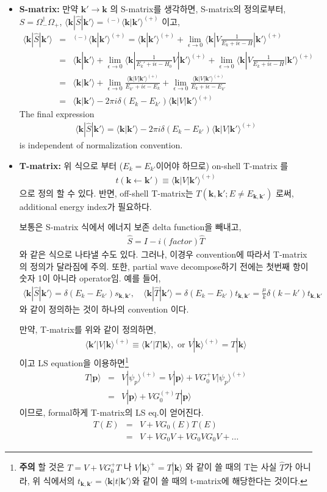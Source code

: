\documentclass[10pt]{book}
\def\bm{\boldsymbol}
\newcommand{\bea}{\begin{eqnarray}}
\newcommand{\eea}{\end{eqnarray}}
\newcommand{\no}{\nonumber \\}
\def\vp{{\bm p}}
\def\vk{{\bm k}}
\def\la{\langle}
\def\ra{\rangle}
\begin{document}
\begin{itemize}
\item {\bf S-matrix:}  만약 $\vk' \to \vk$ 의 S-matrix를 생각하면, 
S-matrix의 정의로부터, $S=\Omega^\dagger_{-}\Omega_{+}$,
$\la \vk|\hat{S}|\vk'\ra ={}^{(-)}\la\vk|\vk'\ra^{(+)}$ 이고,
\bea
\la \vk|\hat{S}|\vk'\ra
&=&{}^{(-)}\la\vk|\vk'\ra^{(+)}
=\la \vk|\vk'\ra^{(+)}
 +\lim_{\epsilon\to 0} \la \vk|V \frac{1}{E_k+ i\epsilon-H}|\vk'\ra^{(+)}\no
&=&\la \vk|\vk'\ra
 +\lim_{\epsilon\to 0} \la \vk|\frac{1}{E_k'+ i\epsilon-H_0}V|\vk'\ra^{(+)}
 +\lim_{\epsilon\to 0} \la \vk|V \frac{1}{E_k+ i\epsilon-H}|\vk'\ra^{(+)}\no
&=&\la \vk|\vk'\ra
 +\lim_{\epsilon\to 0}\frac{\la \vk|V |\vk'\ra^{(+)}}
                           {E_{k'}+ i\epsilon-E_{k}} 
 +\lim_{\epsilon\to 0}\frac{\la \vk|V|\vk'\ra^{(+)}}
                           {E_k+ i\epsilon-E_{k'}  } 
\no
&=&\la \vk|\vk'\ra-2\pi i\delta(E_k-E_{k'})\la \vk|V|\vk'\ra^{(+)}
\eea
The final expression
\bea
\boxed{
\la \vk|\hat{S}|\vk'\ra=\la \vk|\vk'\ra-2\pi i\delta(E_k-E_{k'})\la \vk|V|\vk'\ra^{(+)}
}
\eea
is independent of normalization convention. 

\item {\bf T-matrix:} 위 식으로 부터 ($E_k=E_{k'}$이어야 하므로) on-shell T-matrix 를 
\bea
t(\vk\leftarrow\vk')\equiv \la \vk|V|\vk'\ra^{(+)}
\eea
으로 정의 할 수 있다. 반면, off-shell T-matrix는 
$T(\vk,\vk'; E\neq E_{\vk,\vk'})$ 로써, additional energy index가 필요하다.  

보통은 S-matrix 식에서 에너지 보존 delta function을 빼내고,
\bea
\hat{S}=I-i(factor)\hat{T}
\eea
와 같은 식으로 나타낼 수도 있다. 
그러나, 이경우 convention에 따라서 T-matrix의 정의가 
달라짐에 주의. 또한, partial wave decompose하기 전에는 첫번째 항이 숫자 1이 아니라
operator임. 
예를 들어, 
\bea
\la\vk|\hat{S}|\vk'\ra=\delta(E_k-E_{k'})s_{\vk,\vk'},
\quad
\la\vk|\hat{T}|\vk'\ra=\delta(E_k-E_{k'})t_{\vk,\vk'}
                 =\frac{\mu}{k}\delta(k-k')t_{\vk,\vk'}
\eea
와 같이 정의하는 것이 하나의 convention 이다.

만약, T-matrix를 위와 같이 정의하면, 
\bea
\boxed{
\la \vk'|V|\vk\ra^{(+)} \equiv \la \vk'|T|\vk\ra,\mbox{ or } 
   V|\vk\ra^{(+)}= T|\vk\ra}
\eea
이고 LS equation을 이용하면\footnote{
{\bf 주의} 할 것은 $T=V+VG^{+}_0T$ 나 $V|\vk\ra^{+}=T|\vk\ra$
와 같이 쓸 때의 T는 사실 $\hat{T}$가 아니라, 
위 식에서의 $t_{\vk,\vk'}=\la \vk|t|\vk'\ra$와 같이 쓸 때의
t-matrix에 해당한다는 것이다.
}
\bea
T|\vp\ra&=&V|\psi_p\ra^{(+)}=V|\vp\ra+VG_0^+ V|\psi_p\ra^{(+)}\no
              &=&V|\vp\ra+V G_0^{(+)} T|\vp\ra
\eea 
이므로, formal하게 T-matrix의 LS eq.이 얻어진다. 
\bea
T(E)&=&V+VG_0(E) T(E) \no 
 &=&V+VG_0V+VG_0VG_0V+\dots 
\eea


\end{itemize}
\end{document}
